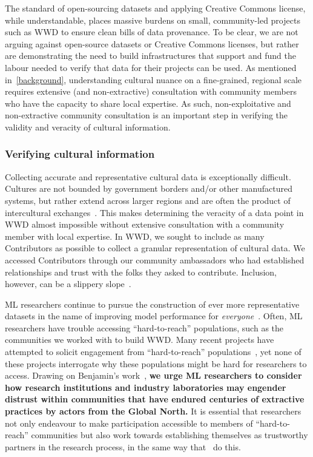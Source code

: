 The standard of open-sourcing datasets and applying Creative Commons license, while understandable, places massive burdens on small, community-led projects such as \textsc{WWD} to ensure clean bills of data provenance. To be clear, we are not arguing against open-source datasets or Creative Commons licenses, but rather are demonstrating the need to build infrastructures that support and fund the labour needed to verify that data for their projects can be used. As mentioned in~\cref{background}, understanding cultural nuance on a fine-grained, regional scale requires extensive (and non-extractive) consultation with community members who have the capacity to share local expertise. As such, non-exploitative and non-extractive community consultation is an important step in verifying the validity and veracity of cultural information. 

\subsubsection{Verifying cultural information}

Collecting accurate and representative cultural data is exceptionally difficult. Cultures are not bounded by government borders and/or other manufactured systems, but rather extend across larger regions and are often the product of intercultural exchanges~\cite{gupta2008beyondculture}. This makes determining the veracity of a data point in \textsc{WWD} almost impossible without extensive consultation with a community member with local expertise. In \textsc{WWD}, we sought to include as many Contributors as possible to collect a granular representation of cultural data. We accessed Contributors through our community ambassadors who had established relationships and trust with the folks they asked to contribute. Inclusion, however, can be a slippery slope~\cite{epstein2008rise,benjamin2016informed}. 

ML researchers continue to pursue the construction of ever more representative datasets in the name of improving model performance for \textit{everyone}~\cite{luccioni2021everyone, radford2018improvingeveryone}. Often, ML researchers have trouble accessing ``hard-to-reach'' populations, such as the communities we worked with to build \textsc{WWD}. Many recent projects have attempted to solicit engagement from ``hard-to-reach'' populations~\cite{kirk2024prism,ramaswamy2023geodegeographicallydiverseevaluation,singh2024aya_dataset}, yet none of these projects interrogate why these populations might be hard for researchers to access. Drawing on Benjamin's work~\cite{benjamin2016informed}, \textbf{we urge ML researchers to consider how research institutions and industry laboratories may engender distrust within communities that have endured centuries of extractive practices by actors from the Global North.} It is essential that researchers not only endeavour to make participation accessible to members of ``hard-to-reach'' communities but also work towards establishing themselves as trustworthy partners in the research process, in the same way that~\citet{singh2024aya_dataset} do this. 

